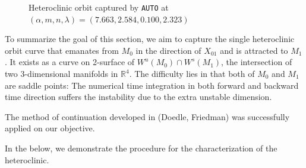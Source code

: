 \documentclass[a4paper,11pt]{article}
\theoremstyle{remark}
\begin{document}
\begin{figure}[ht]
 \centering
  \quad \quad
  \caption{Heteroclinic orbit captured by \texttt{AUTO} at $(\alpha,m,n,\lambda) = (7.663,2.584,0.100,2.323)$} \label{fig:hetero}
\end{figure}



To summarize the goal of this section, we aim to capture the single heteroclinic orbit curve that emanates from $M_0$ in the direction of $X_{01}$ and is attracted to $M_1$. It exists as a curve on 2-surface of $W^u(M_0)\cap W^s(M_1)$, the intersection of two 3-dimensional manifolds in $\mathbb{R}^4$. The difficulty lies in that both of $M_0$ and $M_1$ are saddle points: The numerical time integration in both forward and backward time direction suffers the instability due to the extra unstable dimension.

The method of continuation developed in {(Doedle, Friedman)} was successfully applied on our objective.

In the below, we demonstrate the procedure for the characterization of the heteroclinic.
\end{document}

